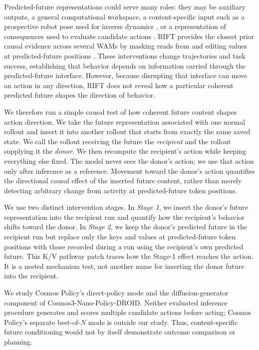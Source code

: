 \documentclass{article}
\begin{document}
Predicted-future representations could serve many roles: they may be auxiliary outputs, a general computational workspace, a content-specific input such as a prospective robot pose used for inverse dynamics \citep{hu2025vpp,du2023unipi}, or a representation of consequences used to evaluate candidate actions \citep{ebert2018visualforesight,du2024videolanguage}. RIFT provides the closest prior causal evidence across several WAMs by masking reads from and editing values at predicted-future positions \citep{zhang2026rift}. These interventions change trajectories and task success, establishing that behavior depends on information carried through the predicted-future interface. However, because disrupting that interface can move an action in any direction, RIFT does not reveal how a particular coherent predicted future shapes the direction of behavior.

We therefore run a simple causal test of how coherent future content shapes action direction. We take the future representation associated with one normal rollout and insert it into another rollout that starts from exactly the same saved state. We call the rollout receiving the future the \emph{recipient} and the rollout supplying it the \emph{donor}. We then recompute the recipient's action while keeping everything else fixed. The model never sees the donor's action; we use that action only after inference as a reference. Movement toward the donor's action quantifies the directional causal effect of the inserted future content, rather than merely detecting arbitrary change from activity at predicted-future token positions.

We use two distinct intervention stages. In \emph{Stage 1}, we insert the donor's future representation into the recipient run and quantify how the recipient's behavior shifts toward the donor. In \emph{Stage 2}, we keep the donor's predicted future in the recipient run but replace only the keys and values at predicted-future token positions with those recorded during a run using the recipient's own predicted future. This K/V pathway patch traces how the Stage-1 effect reaches the action. It is a nested mechanism test, not another name for inserting the donor future into the recipient.

We study Cosmos Policy's direct-policy mode and the diffusion-generator component of Cosmos3-Nano-Policy-DROID. Neither evaluated inference procedure generates and scores multiple candidate actions before acting; Cosmos Policy's separate best-of-$N$ mode is outside our study. Thus, content-specific future conditioning would not by itself demonstrate outcome comparison or planning.
\end{document}
